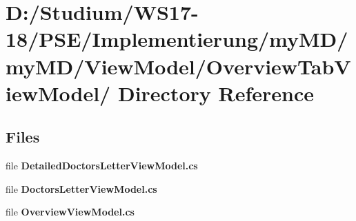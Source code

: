 \hypertarget{dir_D_3A_2FStudium_2FWS17_2D18_2FPSE_2FImplementierung_2FmyMD_2FmyMD_2FViewModel_2FOverviewTabViewModel_2F}{
\section{D:/Studium/WS17-18/PSE/Implementierung/my\-MD/my\-MD/View\-Model/Overview\-Tab\-View\-Model/ Directory Reference}
\label{dir_D_3A_2FStudium_2FWS17_2D18_2FPSE_2FImplementierung_2FmyMD_2FmyMD_2FViewModel_2FOverviewTabViewModel_2F}
}


\subsection*{Files}
\begin{CompactItemize}
\item 
file {\bf Detailed\-Doctors\-Letter\-View\-Model.cs}
\item 
file {\bf Doctors\-Letter\-View\-Model.cs}
\item 
file {\bf Overview\-View\-Model.cs}
\end{CompactItemize}
